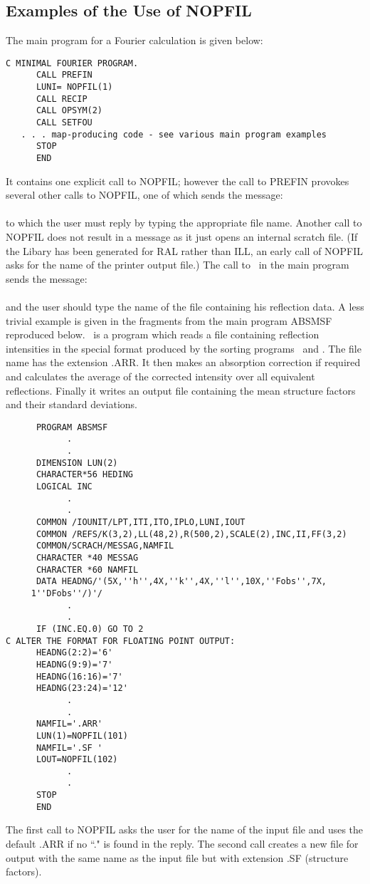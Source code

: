 \subsection{Examples of the Use of NOPFIL} 
The main program for a Fourier calculation is given below:
\begin{verbatim}C MINIMAL FOURIER PROGRAM.
      CALL PREFIN
      LUNI= NOPFIL(1)
      CALL RECIP
      CALL OPSYM(2)
      CALL SETFOU
   . . . map-producing code - see various main program examples
      STOP
      END
\end{verbatim}
\ssk
It contains one explicit call to NOPFIL; however the call to PREFIN
provokes several other calls to NOPFIL, one of which sends the message:\\ 
\\ 
to which the user must reply by typing the appropriate file name.
Another call to NOPFIL does not result in a message as it just opens
an internal scratch file.  (If the Libary has been generated for RAL rather
than ILL, an early call of NOPFIL asks for the name of the printer 
output file.)\p
The call to \ in the main program sends
the message:\\ 
\\ 
and the user should type the name of the file containing his reflection data.\p
A less trivial example is given in the fragments from the main program ABSMSF
reproduced below. \ is a program which reads a file containing
reflection intensities in the special format produced by the sorting
programs \ and .  
The file name has the extension .ARR.
 It then makes 
an absorption correction if required and calculates the 
average of the corrected intensity over all equivalent reflections. Finally
it writes an output file containing
the mean structure factors and their standard deviations.
\\[0.2ex]
\begin{verbatim}      PROGRAM ABSMSF
            .
            .
      DIMENSION LUN(2)
      CHARACTER*56 HEDING
      LOGICAL INC
            .
            .
      COMMON /IOUNIT/LPT,ITI,ITO,IPLO,LUNI,IOUT
      COMMON /REFS/K(3,2),LL(48,2),R(500,2),SCALE(2),INC,II,FF(3,2)
      COMMON/SCRACH/MESSAG,NAMFIL
      CHARACTER *40 MESSAG
      CHARACTER *60 NAMFIL
      DATA HEADNG/'(5X,''h'',4X,''k'',4X,''l'',10X,''Fobs'',7X,
     1''DFobs''/)'/
            .
            .
      IF (INC.EQ.0) GO TO 2
C ALTER THE FORMAT FOR FLOATING POINT OUTPUT:
      HEADNG(2:2)='6'
      HEADNG(9:9)='7'
      HEADNG(16:16)='7'
      HEADNG(23:24)='12'
            .
            .
      NAMFIL='.ARR'
      LUN(1)=NOPFIL(101)
      NAMFIL='.SF '
      LOUT=NOPFIL(102)
            .
            .
      STOP
      END
\end{verbatim}
\ssk
The first call to NOPFIL asks the user for the name of the input file
and uses the default .ARR if no ``." is found in the reply.
The second call creates a new file for output with the same name as
the input file but with extension .SF (structure factors).
